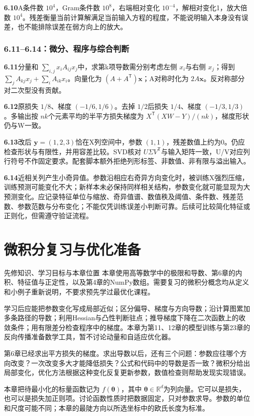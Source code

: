 \documentclass[UTF8,fontset=none,zihao=-4,a4paper]{ctexart}
\newcommand{\chapterpage}[1]{\clearpage\section{#1}}
\numberwithin{equation}{section}
\numberwithin{figure}{section}
\begin{document}
\textbf{6.10}\quad A条件数 $10^4$，Gram条件数 $10^8$，右端相对变化 $10^{-4}$，解相对变化1，放大倍数 $10^4$。残差衡量当前计算解满足当前输入方程的程度，不能说明输入本身没有误差，也不能排除误差在弱方向上的放大。

\clearpage
\subsubsection*{6.11--6.14：微分、程序与综合判断}
\textbf{6.11}\quad 分量和 $\sum_{i,j}x_iA_{ij}x_j$中，求第k项导数需分别考虑左侧 $x_i$与右侧 $x_j$；得到 $\sum_jA_{kj}x_j+\sum_iA_{ik}x_i$。向量化为 $(A+A^{\mathsf T})\symbf x$；A对称时化为 $2A\symbf x$。反对称部分对二次型没有贡献。

\textbf{6.12}\quad 原损失 $1/8$、梯度 $(-1/6,1/6)$。去掉 $1/2$后损失 $1/4$、梯度 $(-1/3,1/3)$。多输出按 $nk$个元素平均的半平方损失梯度为 $X^{\mathsf T}(XW-Y)/(nk)$，梯度形状仍与W一致。

\textbf{6.13}\quad 改后 $\symbf y=(1,2,3)$恰在X列空间中，参数 $(1,1)$，残差数值上约为0。仍应检查形状与有限性，并用容差比较。SVD核对 $U\Sigma V^{\mathsf T}$与输入矩阵一致，U/V对应列行符号不作固定要求。配套脚本额外拒绝列形标签、非数值、非有限与溢出输入。

\textbf{6.14}\quad 近相关列产生小奇异值。参数沿相应右奇异方向变化时，被训练X强烈压缩，训练预测可能变化不大；新样本未必保持同样相关结构，参数变化就可能显现为大预测变化。应记录特征单位与缩放、奇异值谱、数值秩及阈值、条件数、残差范数、参数范数与分布变化；不能仅凭训练误差小判断可靠。后续可比较简化特征或正则化，但需遵守验证流程。

\chapterpage{微积分复习与优化准备}\label{ch:calculus}
\begin{infobox}{先修知识、学习目标与本章位置}
本章使用高等数学中的极限和导数、第6章的内积、特征值与正定性，以及第4章的NumPy数组。需要复习的微积分概念均从定义和小例子重新说明，不要求预先学过最优化课程。

学习后应能把参数变化写成局部近似；区分偏导、梯度与方向导数；沿计算图累加多条路径的导数；利用Hessian与凸性判断驻点；推导梯度下降在二次函数上的收敛条件；用有限差分检查程序中的梯度。本章为第11、12章的模型训练与第23章的反向传播准备数学工具，暂不讨论动量和自适应优化器。
\end{infobox}
第6章已经求出平方损失的梯度。求出导数以后，还有三个问题：参数应往哪个方向改变？一次改变多大才能降低损失？公式和代码中的导数是否一致？微积分给出局部变化，优化方法根据这种变化反复更新参数，数值检查则帮助发现实现错误。

本章把待最小化的标量函数记为 $f(\symbf\theta)$，其中 $\symbf\theta\in\mathbb R^d$为列向量。它可以是损失，也可以是损失加正则项。讨论函数性质时把数据固定，只对参数求导。参数的单位和尺度可能不同；本章的最陡方向以所选坐标中的欧氏长度为标准。
\end{document}

